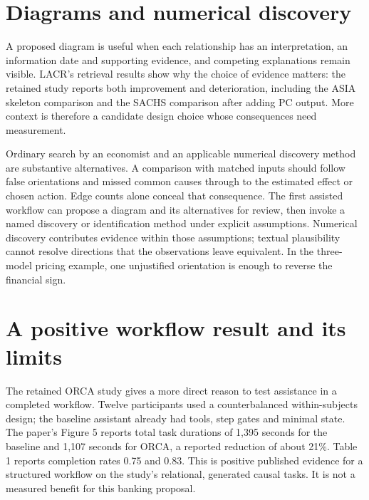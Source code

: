 


\section{Diagrams and numerical discovery}
A proposed diagram is useful when each relationship has an interpretation,
an information date and supporting evidence, and competing explanations remain
visible. LACR's retrieval results show why the choice of evidence matters: the
retained study reports both improvement and deterioration, including the ASIA
skeleton comparison and the SACHS comparison after adding PC output. More
context is therefore a candidate design choice whose consequences need
measurement. \citep{v12_la_2402_15301}

Ordinary search by an economist and an applicable numerical discovery method
are substantive alternatives. A comparison with matched inputs should follow
false orientations and missed common causes through to the estimated effect
or chosen action. Edge counts alone conceal that consequence. The first
assisted workflow can propose a diagram and its alternatives for review, then
invoke a named discovery or identification method under explicit assumptions.
Numerical discovery contributes evidence within those assumptions; textual
plausibility cannot resolve directions that the observations leave equivalent.
In the three-model pricing example, one unjustified orientation is enough to
reverse the financial sign.



\section{A positive workflow result and its limits}
The retained ORCA study gives a more direct reason to test assistance in a
completed workflow. Twelve participants used a counterbalanced within-subjects
design; the baseline assistant already had tools, step gates and minimal
state. The paper's Figure 5 reports total task durations of 1,395 seconds
for the baseline and 1,107 seconds for ORCA, a reported reduction of about
21\%. Table 1 reports completion rates 0.75 and 0.83. This is positive
published evidence for a structured workflow on the study's relational,
generated causal tasks. It is not a measured benefit for this banking
proposal. \citep[pp.~3--5]{exec13_census_orca}

